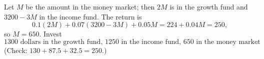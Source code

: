 Let $M$ be the amount in the money market; then $2M$ is in the growth fund and $3200-3M$ in the income fund. The return is
\[0.1(2M)+0.07(3200-3M)+0.05M=224+0.04M=250,\]
so $M=650$. Invest
\[\boxed{1300\text{ dollars in the growth fund, }1250\text{ in the income fund, }650\text{ in the money market}}.\]
(Check: $130+87.5+32.5=250$.)
